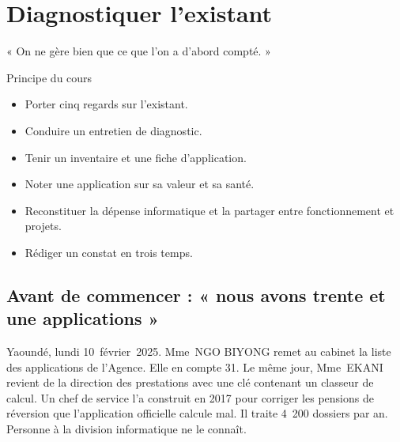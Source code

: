
\chapter{Diagnostiquer l'existant}
\label{chap:diagnostic}

\epigraph{%
    « On ne gère bien que ce que l'on a d'abord compté. »%
}{Principe du cours}


\begin{boxobjectifs}
\begin{itemize}
    \item Porter cinq regards sur l'existant.
    \item Conduire un entretien de diagnostic.
    \item Tenir un inventaire et une fiche d'application.
    \item Noter une application sur sa valeur et sa santé.
    \item Reconstituer la dépense informatique et la partager entre fonctionnement et projets.
    \item Rédiger un constat en trois temps.
\end{itemize}
\end{boxobjectifs}

\bigskip

\section*{Avant de commencer : « nous avons trente et une applications »}

Yaoundé, lundi 10~février~2025. Mme~NGO BIYONG remet au cabinet la liste des applications de l'Agence. Elle en
compte 31. Le même jour, Mme~EKANI revient de la direction des prestations avec une clé contenant un classeur
de calcul. Un chef de service l'a construit en 2017 pour corriger les pensions de réversion que l'application
officielle calcule mal. Il traite 4~200 dossiers par an. Personne à la division informatique ne le connaît.

